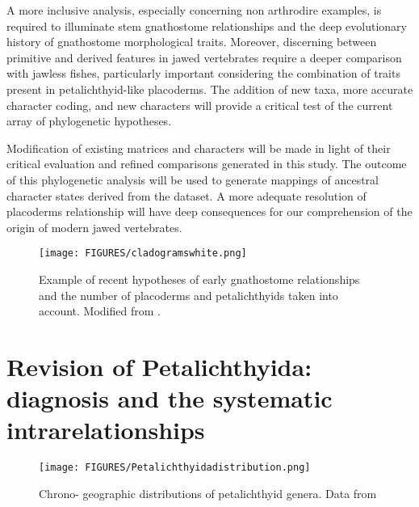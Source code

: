 \documentclass[11pt,letterpaper]{report}
\begin{document}
A more inclusive analysis, especially concerning non arthrodire examples, is required to illuminate stem gnathostome relationships and the deep evolutionary history of gnathostome morphological traits. Moreover, discerning between primitive and derived features in jawed vertebrates require a deeper comparison with jawless fishes, particularly important considering the combination of traits present in petalichthyid-like placoderms. The addition of new taxa, more accurate character coding, and new characters will provide a critical test of the current array of phylogenetic hypotheses. 

Modification of existing matrices and characters will be made in light of their critical evaluation and refined comparisons generated in this study. The outcome of this phylogenetic analysis will be used to generate mappings of ancestral character states derived from the dataset. A more adequate resolution of placoderms relationship will have deep consequences for our comprehension of the origin of modern jawed vertebrates.

\begin{figure}[!h]
\centering
    \texttt{[image: FIGURES/cladogramswhite.png]}
\caption{\footnotesize{Example of recent hypotheses of early gnathostome relationships and the number of placoderms and petalichthyids taken into account. Modified from \citealt{zhu2013silurian,long2015copulation,giles2015osteichthyan}.}}
\label{clado}
\end{figure}

\section{Revision of Petalichthyida: diagnosis and the systematic intrarelationships}

\begin{figure}[!h]
\centering
    \texttt{[image: FIGURES/Petalichthyidadistribution.png]}
\caption{\footnotesize{Chrono- geographic distributions of petalichthyid genera. Data from \citealt{Zhu1996a,Vietnam,pan2015new}}}
\label{petaldistrib}
\end{figure}
\end{document}

